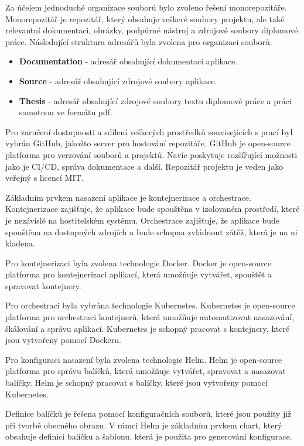 Za účelem jednoduché organizace souborů bylo zvoleno řešení monorepozitáře. Monorepozitář je repozitář, který obsahuje veškeré soubory projektu, ale také relevantní dokumentaci, obrázky, podpůrné nástroj a zdrojové soubory diplomové práce. Následující struktura adresářů byla zvolena pro organizaci souborů.

\begin{itemize}
    \item \textbf{Documentation} - adresář obsahující dokumentaci aplikace.
    \item \textbf{Source} - adresář obsahující zdrojové soubory aplikace.
    \item \textbf{Thesis} - adresář obsahující zdrojové soubory textu diplomové práce a práci samotnou ve formátu pdf.
\end{itemize}

Pro zaručení dostupnosti a sdílení veškerých prostředků souvisejících s prací byl vybrán GitHub, jakožto server pro hostování repozitáře. GitHub je open-source platforma pro verzování souborů a projektů. Navíc poskytuje rozšířující možnosti jako je CI/CD, správa dokumentace a další. Repozitář projektu je veden jako veřejný s licencí MIT.


Základním prvkem nasazení aplikace je kontejnerizace a orchestrace. Kontejnerizace zajišťuje, že aplikace bude spouštěna v izolovaném prostředí, které je nezávislé na hostitelském systému. Orchestrace zajišťuje, že aplikace bude spouštěna na dostupných zdrojích a bude schopna zvládnout zátěž, která je na ni kladena.

Pro kontejnerizaci byla zvolena technologie Docker. Docker je open-source platforma pro kontejnerizaci aplikací, která umožňuje vytvářet, spouštět a spravovat kontejnery.

Pro orchestraci byla vybrána technologie Kubernetes. Kubernetes je open-source platforma pro orchestraci kontejnerů, která umožňuje automatizovat nasazování, škálování a správu aplikací. Kubernetes je schopný pracovat s kontejnery, které jsou vytvořeny pomocí Dockeru.


Pro konfiguraci nasazení byla zvolena technologie Helm. Helm je open-source platforma pro správu balíčků, která umožňuje vytvářet, spravovat a nasazovat balíčky. Helm je schopný pracovat s balíčky, které jsou vytvořeny pomocí Kubernetes.

Definice balíčků je řešena pomocí konfiguračních souborů, které jsou použity již při tvorbě obecného obrazu. V rámci Helm je základním prvkem chart, který obsahuje definici balíčku a šablonu, která je použita pro generování konfigurace.

